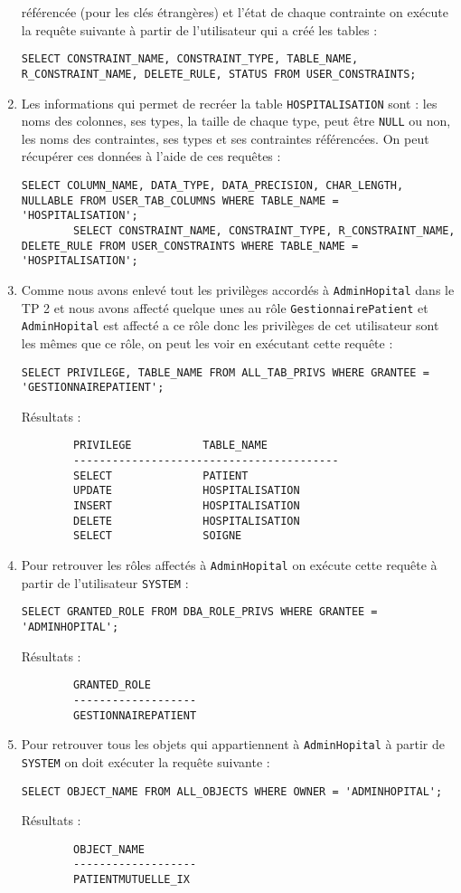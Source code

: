 \documentclass[12pt,a4paper]{article}
\begin{document}
\begin{enumerate}
	référencée (pour les clés étrangères) et l'état de chaque contrainte on exécute la requête suivante à partir de l'utilisateur
	qui a créé les tables :
	\begin{lstlisting}[style=OracleSQL]
		SELECT CONSTRAINT_NAME, CONSTRAINT_TYPE, TABLE_NAME, R_CONSTRAINT_NAME, DELETE_RULE, STATUS FROM USER_CONSTRAINTS;
	\end{lstlisting}
	\item Les informations qui permet de recréer la table \texttt{HOSPITALISATION} sont : les noms des colonnes, ses types, la taille
	de chaque type, peut être \texttt{NULL} ou non, les noms des contraintes, ses types et ses contraintes référencées. On peut
	récupérer ces données à l'aide de ces requêtes :
	\begin{lstlisting}[style=OracleSQL]
		SELECT COLUMN_NAME, DATA_TYPE, DATA_PRECISION, CHAR_LENGTH, NULLABLE FROM USER_TAB_COLUMNS WHERE TABLE_NAME = 'HOSPITALISATION';
		SELECT CONSTRAINT_NAME, CONSTRAINT_TYPE, R_CONSTRAINT_NAME, DELETE_RULE FROM USER_CONSTRAINTS WHERE TABLE_NAME = 'HOSPITALISATION';
	\end{lstlisting}
	\item Comme nous avons enlevé tout les privilèges accordés à \texttt{AdminHopital} dans le TP 2 et nous avons affecté quelque unes
	au rôle \texttt{GestionnairePatient} et \texttt{AdminHopital} est affecté a ce rôle donc les privilèges de cet utilisateur sont
	les mêmes que ce rôle, on peut les voir en exécutant cette requête :
	\begin{lstlisting}[style=OracleSQL]
		SELECT PRIVILEGE, TABLE_NAME FROM ALL_TAB_PRIVS WHERE GRANTEE = 'GESTIONNAIREPATIENT';
	\end{lstlisting}
	Résultats :
	\begin{verbatim}
		PRIVILEGE           TABLE_NAME
		-----------------------------------------
		SELECT              PATIENT
		UPDATE              HOSPITALISATION
		INSERT              HOSPITALISATION
		DELETE              HOSPITALISATION
		SELECT              SOIGNE
	\end{verbatim}
	\item Pour retrouver les rôles affectés à \texttt{AdminHopital} on exécute cette requête à partir de l'utilisateur
	\texttt{SYSTEM} :
	\begin{lstlisting}[style=OracleSQL]
		SELECT GRANTED_ROLE FROM DBA_ROLE_PRIVS WHERE GRANTEE = 'ADMINHOPITAL';
	\end{lstlisting}
	Résultats :
	\begin{verbatim}
		GRANTED_ROLE
		-------------------
		GESTIONNAIREPATIENT
	\end{verbatim}
	\item Pour retrouver tous les objets qui appartiennent à \texttt{AdminHopital} à partir de \texttt{SYSTEM} on doit
	exécuter la requête suivante :
	\begin{lstlisting}[style=OracleSQL]
		SELECT OBJECT_NAME FROM ALL_OBJECTS WHERE OWNER = 'ADMINHOPITAL';
	\end{lstlisting}
	Résultats :
	\begin{verbatim}
		OBJECT_NAME
		-------------------
		PATIENTMUTUELLE_IX
	\end{verbatim}
\end{enumerate}
\end{document}
